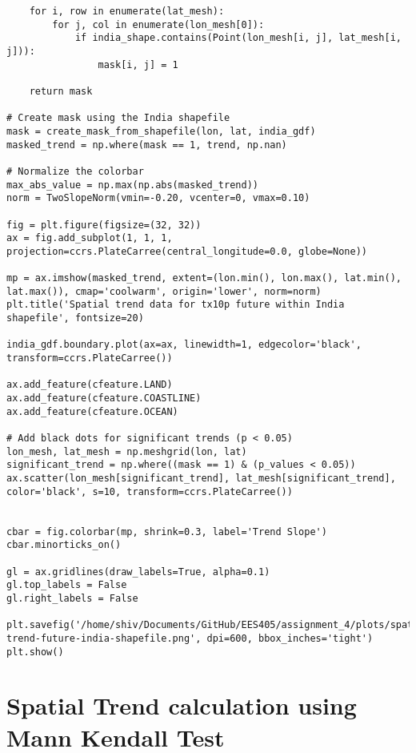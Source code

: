 \documentclass[a4paper, 12pt, twoside]{report}
\begin{document}
\begin{lstlisting}
    for i, row in enumerate(lat_mesh):
        for j, col in enumerate(lon_mesh[0]):
            if india_shape.contains(Point(lon_mesh[i, j], lat_mesh[i, j])):
                mask[i, j] = 1

    return mask

# Create mask using the India shapefile
mask = create_mask_from_shapefile(lon, lat, india_gdf)
masked_trend = np.where(mask == 1, trend, np.nan)

# Normalize the colorbar
max_abs_value = np.max(np.abs(masked_trend))
norm = TwoSlopeNorm(vmin=-0.20, vcenter=0, vmax=0.10)

fig = plt.figure(figsize=(32, 32))
ax = fig.add_subplot(1, 1, 1, projection=ccrs.PlateCarree(central_longitude=0.0, globe=None))

mp = ax.imshow(masked_trend, extent=(lon.min(), lon.max(), lat.min(), lat.max()), cmap='coolwarm', origin='lower', norm=norm)
plt.title('Spatial trend data for tx10p future within India shapefile', fontsize=20)

india_gdf.boundary.plot(ax=ax, linewidth=1, edgecolor='black', transform=ccrs.PlateCarree())

ax.add_feature(cfeature.LAND)
ax.add_feature(cfeature.COASTLINE)
ax.add_feature(cfeature.OCEAN)

# Add black dots for significant trends (p < 0.05)
lon_mesh, lat_mesh = np.meshgrid(lon, lat)
significant_trend = np.where((mask == 1) & (p_values < 0.05))
ax.scatter(lon_mesh[significant_trend], lat_mesh[significant_trend], color='black', s=10, transform=ccrs.PlateCarree())


cbar = fig.colorbar(mp, shrink=0.3, label='Trend Slope')
cbar.minorticks_on()

gl = ax.gridlines(draw_labels=True, alpha=0.1)
gl.top_labels = False
gl.right_labels = False

plt.savefig('/home/shiv/Documents/GitHub/EES405/assignment_4/plots/spatial-trend-future-india-shapefile.png', dpi=600, bbox_inches='tight')
plt.show()

\end{lstlisting}



\section{Spatial Trend calculation using Mann Kendall Test}
\end{document}

